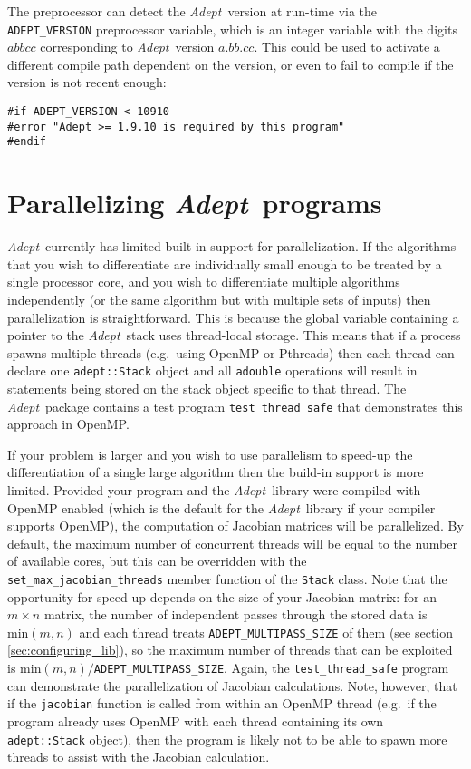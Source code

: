 \documentclass[a4,oneside]{book}
\def\codesize{\small}
\def\Adept{\emph{Adept}}
\def\code#1{{\codesize\texttt{#1}}}
\begin{document}
The preprocessor can detect the \Adept\ version at run-time via the
\code{ADEPT\_VERSION} preprocessor variable, which is an integer
variable with the digits $abbcc$ corresponding to \Adept\ version
$a.bb.cc$. This could be used to activate a different compile path
dependent on the version, or even to fail to compile if the version is
not recent enough:
\begin{lstlisting}
#if ADEPT_VERSION < 10910
#error "Adept >= 1.9.10 is required by this program"
#endif
\end{lstlisting}

\section{Parallelizing \Adept\ programs}
\Adept\ currently has limited built-in support for parallelization. If
the algorithms that you wish to differentiate are individually small
enough to be treated by a single processor core, and you wish to
differentiate multiple algorithms independently (or the same algorithm
but with multiple sets of inputs) then parallelization is
straightforward. This is because the global variable containing a
pointer to the \Adept\ stack uses thread-local storage.  This means
that if a process spawns multiple threads (e.g.\ using OpenMP or
Pthreads) then each thread can declare one \code{adept::Stack} object
and all \code{adouble} operations will result in statements being
stored on the stack object specific to that thread.  The
\Adept\ package contains a test program \code{test\_thread\_safe} that
demonstrates this approach in OpenMP.

If your problem is larger and you wish to use parallelism to speed-up
the differentiation of a single large algorithm then the build-in
support is more limited. Provided your program and the \Adept\ library
were compiled with OpenMP enabled (which is the default for the
\Adept\ library if your compiler supports OpenMP), the computation of
Jacobian matrices will be parallelized.  By default, the maximum
number of concurrent threads will be equal to the number of available
cores, but this can be overridden with the
\code{set\_max\_jacobian\_threads} member function of the \code{Stack}
class.  Note that the opportunity for speed-up depends on the size of
your Jacobian matrix: for an $m\times n$ matrix, the number of
independent passes through the stored data is $\mathrm{min}(m,n)$ and
each thread treats \code{ADEPT\_MULTIPASS\_SIZE} of them (see section
\ref{sec:configuring_lib}), so the maximum number of threads that can
be exploited is $\mathrm{min}(m,n)/$\code{ADEPT\_MULTIPASS\_SIZE}.
Again, the \code{test\_thread\_safe} program can demonstrate the
parallelization of Jacobian calculations.  Note, however, that if the
\code{jacobian} function is called from within an OpenMP thread
(e.g.\ if the program already uses OpenMP with each thread containing
its own \code{adept::Stack} object), then the program is likely not to
be able to spawn more threads to assist with the Jacobian calculation.
\end{document}
